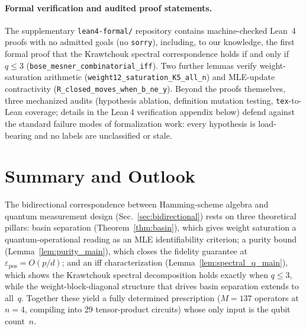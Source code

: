 \documentclass[twocolumn,prx,aps,superscriptaddress,longbibliography,floatfix]{revtex4-2}
\newcommand{\pclaim}[4]{}
\begin{document}
\paragraph{Formal verification and audited proof statements.}
The supplementary \texttt{lean4-formal/} repository contains
machine-checked Lean~4 proofs with no admitted goals
(no \texttt{sorry}), including, to our knowledge, the first
formal proof that the Krawtchouk spectral correspondence holds
if and only if $q \le 3$
(\texttt{bose\_mesner\_combinatorial\_iff}).
Two further lemmas verify weight-saturation arithmetic
(\texttt{weight12\_saturation\_K5\_all\_n}) and MLE-update
contractivity (\texttt{R\_closed\_moves\_when\_b\_ne\_y}).
Beyond the proofs themselves, three mechanized audits
(hypothesis ablation, definition mutation testing, \texttt{tex}-to-Lean
coverage; details in the Lean\,4 verification appendix below)
defend against the standard failure modes of formalization work:
every hypothesis is load-bearing and no labels are unclassified
or stale.

\section{Summary and Outlook}
\label{sec:conclusion}

The bidirectional correspondence between Hamming-scheme
algebra and quantum measurement design
(Sec.~\ref{sec:bidirectional}) rests on three theoretical pillars:
\pclaim{prose:summary:basin}{proved}{*}{thm:basin}%
basin separation (Theorem~\ref{thm:basin}), which gives weight
saturation a quantum-operational reading as an MLE identifiability
criterion;
a purity bound (Lemma~\ref{lem:purity_main}), which closes the
fidelity guarantee at $\varepsilon_{\mathrm{pos}} = O(p/d)$;
\pclaim{prose:summary:iff}{proved}{*}{lem:spectral_q_main}%
and an iff characterization
(Lemma~\ref{lem:spectral_q_main}), which shows the Krawtchouk
spectral decomposition holds exactly when $q \le 3$, while the
weight-block-diagonal structure that drives basin separation
extends to all~$q$.
Together these yield a fully determined prescription ($M = 137$
operators at $n = 4$, compiling into 29 tensor-product circuits)
whose only input is the qubit count~$n$.
\end{document}

